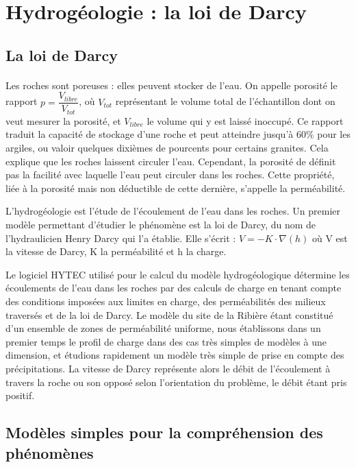 \documentclass{article}
\begin{document}
\newpage
\section{Hydrogéologie : la loi de Darcy}
\subsection{La loi de Darcy}

\paragraph{} Les roches sont poreuses : elles peuvent stocker de l’eau. On appelle porosité le rapport $p=\dfrac{V_{libre}}{V_{tot}}$, où $V_{tot}$ représentant le volume total de l'échantillon dont on veut mesurer la porosité, et $V_{libre}$ le volume qui y est laissé inoccupé. Ce rapport traduit la capacité de stockage d'une roche et peut atteindre jusqu’à 60\% pour les argiles, ou valoir quelques dixièmes de pourcents pour certains granites. Cela explique que les roches laissent circuler l’eau. Cependant, la porosité de définit pas la facilité avec laquelle l’eau peut circuler dans les roches. Cette propriété, liée à la porosité mais non déductible de cette dernière, s’appelle la perméabilité.

L’hydrogéologie est l’étude de l’écoulement de l’eau dans les roches. Un premier modèle permettant d’étudier le phénomène est la loi de Darcy, du nom de l’hydraulicien Henry Darcy qui l’a établie. Elle s’écrit : $V = - K\cdot \nabla(h)$ où V est la vitesse de Darcy, K la perméabilité et h la charge. %

Le logiciel HYTEC utilisé pour le calcul du modèle hydrogéologique détermine les écoulements de l’eau dans les roches par des calculs de charge en tenant compte des conditions imposées aux limites en charge, des perméabilités des milieux traversés et de la loi de Darcy. Le modèle du site de la Ribière étant constitué d’un ensemble de zones de perméabilité uniforme, nous établissons dans un premier temps le profil de charge dans des cas très simples de modèles à une dimension, et étudions rapidement un modèle très simple de prise en compte des précipitations. La vitesse de Darcy représente alors le débit de l’écoulement à travers la roche ou son opposé selon l'orientation du problème, le débit étant pris positif. 
\subsection{Modèles simples pour la compréhension des phénomènes}
\end{document}
